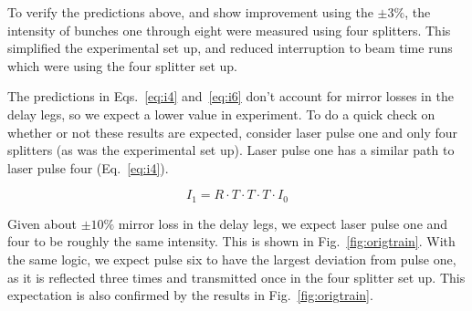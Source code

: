 To verify the predictions above, and show improvement using the $\pm3\%$,
the intensity of bunches one through eight were measured using four splitters. 
This simplified the experimental set up, and reduced interruption to beam time 
runs which were using the four splitter set up.  

The predictions in Eqs.~\ref{eq:i4} and~\ref{eq:i6} don't account for mirror losses in the delay legs, 
so we expect a lower value in experiment. To do a quick check on whether or not these results are 
expected, consider laser pulse one and only four splitters (as was the experimental set up). 
Laser pulse one has a similar path to laser pulse four (Eq.~\ref{eq:i4}). 

\begin{equation}
I_1 = R \cdot T \cdot T \cdot T \cdot I_0 
\end{equation}

Given about $\pm10\%$ mirror loss in the delay legs, we expect laser pulse one and four 
to be roughly the same intensity. This is shown in Fig.~\ref{fig:origtrain}. With the same 
logic, we expect pulse six to have the largest deviation from pulse one, as it is reflected 
three times and transmitted once in the four splitter set up. This expectation is also 
confirmed by the results in Fig.~\ref{fig:origtrain}.    

